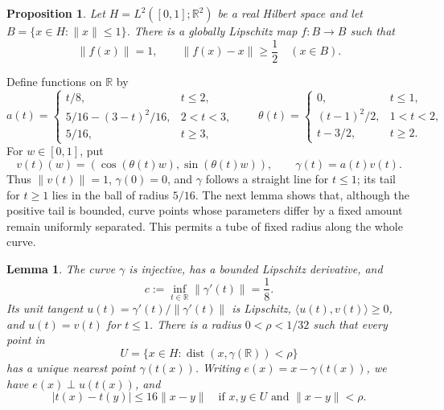 \documentclass[11pt]{article}
\newcommand{\R}{\mathbb R}
\newcommand{\norm}[1]{\lVert #1\rVert}
\newcommand{\ip}[2]{\langle #1,#2\rangle}
\newtheorem{lemma}[theorem]{Lemma}
\newtheorem{proposition}[theorem]{Proposition}
\theoremstyle{definition}
\numberwithin{equation}{section}
\begin{document}
\begin{proposition}\label{aux:map}
Let $H=L^2([0,1];\R^2)$ be a real Hilbert space and let
$B=\{x\in H:\norm{x}\le1\}$. There is a globally Lipschitz map $f:B\to B$
such that
\[
  \norm{f(x)}=1,
  \qquad \norm{f(x)-x}\ge\frac12
  \quad(x\in B).
\]
\end{proposition}

Define functions on $\R$ by
\[
 a(t)=
 \begin{cases}
 t/8,&t\le2,\\
 5/16-(3-t)^2/16,&2<t<3,\\
 5/16,&t\ge3,
 \end{cases}
 \qquad
 \theta(t)=
 \begin{cases}
 0,&t\le1,\\
 (t-1)^2/2,&1<t<2,\\
 t-3/2,&t\ge2.
 \end{cases}
\]
For $w\in[0,1]$, put
\[
 v(t)(w)=(\cos(\theta(t)w),\sin(\theta(t)w)),
 \qquad \gamma(t)=a(t)v(t).
\]
Thus $\norm{v(t)}=1$, $\gamma(0)=0$, and $\gamma$ follows a straight line
for $t\le1$; its tail for $t\ge1$ lies in the ball of radius $5/16$.
The next lemma shows that, although the positive tail is bounded, curve
points whose parameters differ by a fixed amount remain uniformly
separated. This permits a tube of fixed radius along the whole curve.

\begin{lemma}\label{aux:tube}
The curve $\gamma$ is injective, has a bounded Lipschitz derivative, and
\[
 c:=\inf_{t\in\R}\norm{\gamma'(t)}=\frac18.
\]
Its unit tangent $u(t)=\gamma'(t)/\norm{\gamma'(t)}$ is Lipschitz,
$\ip{u(t)}{v(t)}\ge0$, and $u(t)=v(t)$ for $t\le1$.
There is a radius $0<\rho<1/32$ such that every point in
\[
 U=\{x\in H:\operatorname{dist}(x,\gamma(\R))<\rho\}
\]
has a unique nearest point $\gamma(t(x))$. Writing
$e(x)=x-\gamma(t(x))$, we have $e(x)\perp u(t(x))$, and
\begin{equation}\label{aux:parameter}
 |t(x)-t(y)|\le16\norm{x-y}
 \quad\text{if }x,y\in U\text{ and }\norm{x-y}<\rho.
\end{equation}
\end{lemma}
\end{document}
